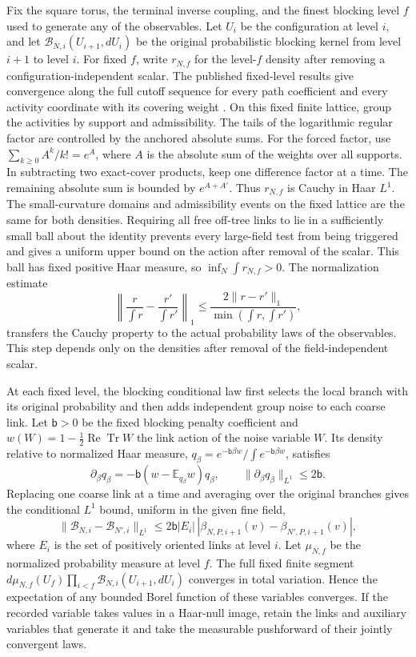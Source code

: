 \documentclass[11pt,a4paper]{article}
\numberwithin{equation}{section}
\newcommand{\Tr}{\operatorname{Tr}}
\begin{document}
Fix the square torus, the terminal inverse coupling, and the finest blocking level \(f\) used to generate any of the observables. Let \(U_i\) be the configuration at level \(i\), and let \(\mathcal B_{N,i}(U_{i+1},dU_i)\) be the original probabilistic blocking kernel from level \(i+1\) to level \(i\). For fixed \(f\), write \(r_{N,f}\) for the level-\(f\) density after removing a configuration-independent scalar. The published fixed-level results give convergence along the full cutoff sequence for every path coefficient and every activity coordinate with its covering weight \cite[Proposition 5.7 and Lemma 13.24]{armstrong}. On this fixed finite lattice, group the activities by support and admissibility. The tails of the logarithmic regular factor are controlled by the anchored absolute sums. For the forced factor, use \(\sum_{k\ge0}A^k/k!=e^A\), where \(A\) is the absolute sum of the weights over all supports. In subtracting two exact-cover products, keep one difference factor at a time. The remaining absolute sum is bounded by \(e^{A+A'}\). Thus \(r_{N,f}\) is Cauchy in Haar \(L^1\). The small-curvature domains and admissibility events on the fixed lattice are the same for both densities. Requiring all free off-tree links to lie in a sufficiently small ball about the identity prevents every large-field test from being triggered and gives a uniform upper bound on the action after removal of the scalar. This ball has fixed positive Haar measure, so \(\inf_N\int r_{N,f}>0\). The normalization estimate
\[
 \left\|\frac{r}{\int r}-\frac{r'}{\int r'}\right\|_1
     \leq \frac{2\|r-r'\|_1}{\min(\int r,\int r')},
\]
transfers the Cauchy property to the actual probability laws of the observables. This step depends only on the densities after removal of the field-independent scalar.

At each fixed level, the blocking conditional law first selects the local branch with its original probability and then adds independent group noise to each coarse link. Let \(\mathsf b>0\) be the fixed blocking penalty coefficient and \(w(W)=1-\tfrac12\operatorname{Re}\Tr W\) the link action of the noise variable \(W\). Its density relative to normalized Haar measure,
\(q_\beta=e^{-\mathsf b\beta w}/\int e^{-\mathsf b\beta w}\), satisfies
\[
 \partial_\beta q_\beta=-\mathsf b(w-\mathbb E_{q_\beta}w)q_\beta,
 \qquad \|\partial_\beta q_\beta\|_{L^1}\leq 2\mathsf b .
\]
Replacing one coarse link at a time and averaging over the original branches gives the conditional \(L^1\) bound, uniform in the given fine field,
\[
 \|\mathcal B_{N,i}-\mathcal B_{N',i}\|_{L^1}
 \le 2\mathsf b |E_i|\,|\beta_{N,P,i+1}(v)-\beta_{N',P,i+1}(v)|,
\]
where \(E_i\) is the set of positively oriented links at level \(i\). Let \(\mu_{N,f}\) be the normalized probability measure at level \(f\). The full fixed finite segment
\(d\mu_{N,f}(U_f)\prod_{i<f}\mathcal B_{N,i}(U_{i+1},dU_i)\)
converges in total variation. Hence the expectation of any bounded Borel function of these variables converges. If the recorded variable takes values in a Haar-null image, retain the links and auxiliary variables that generate it and take the measurable pushforward of their jointly convergent laws.
\end{document}
